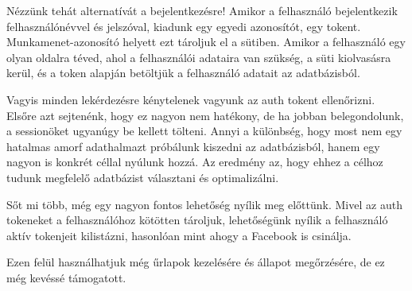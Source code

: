 Nézzünk tehát alternatívát a bejelentkezésre!
Amikor a felhasználó bejelentkezik felhasználónévvel és jelszóval, kiadunk egy egyedi azonosítót, egy tokent. Munkamenet-azonosító helyett ezt tároljuk el a sütiben. Amikor a felhasználó egy olyan oldalra téved, ahol a felhasználói adataira van szükség, a süti kiolvasásra kerül, és a token alapján betöltjük a felhasználó adatait az adatbázisból.

Vagyis minden lekérdezésre kénytelenek vagyunk az auth tokent ellenőrizni. Elsőre azt sejtenénk, hogy ez nagyon nem hatékony, de ha jobban belegondolunk, a sessionöket ugyanúgy be kellett tölteni. Annyi a különbség, hogy most nem egy hatalmas amorf adathalmazt próbálunk kiszedni az adatbázisból, hanem egy nagyon is konkrét céllal nyúlunk hozzá. Az eredmény az, hogy ehhez a célhoz tudunk megfelelő adatbázist választani és optimalizálni.

Sőt mi több, még egy nagyon fontos lehetőség nyílik meg előttünk. Mivel az auth tokeneket a felhasználóhoz kötötten tároljuk, lehetőségünk nyílik a felhasználó aktív tokenjeit kilistázni, hasonlóan mint ahogy a Facebook is csinálja.

Ezen felül használhatjuk még űrlapok kezelésére és állapot megőrzésére, de ez még kevéssé támogatott. \cite{session}

























